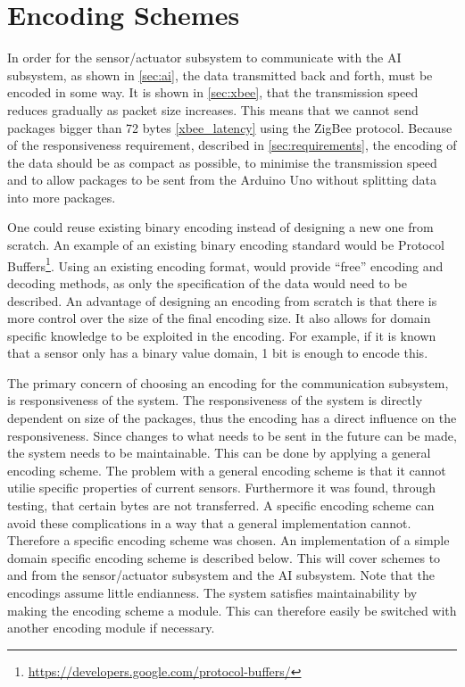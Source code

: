 \section{Encoding Schemes}
\label{sec:encoding}
In order for the sensor/actuator subsystem to communicate with the AI subsystem, as shown in \cref{sec:ai}, the data transmitted back and forth, must be encoded in some way. It is shown in \cref{sec:xbee}, that the transmission speed reduces gradually as packet size increases. This means that we cannot send packages bigger than 72 bytes \cref{xbee_latency} using the ZigBee protocol. Because of the responsiveness requirement, described in \cref{sec:requirements}, the encoding of the data should be as compact as possible, to minimise the transmission speed and to allow packages to be sent from the Arduino Uno without splitting data into more packages.

One could reuse existing binary encoding instead of designing a new one from scratch. An example of an existing binary encoding standard would be Protocol Buffers\footnote{\url{https://developers.google.com/protocol-buffers/}}. Using an existing encoding format, would provide \enquote{free} encoding and decoding methods, as only the specification of the data would need to be described. An advantage of designing an encoding from scratch is that there is more control over the size of the final encoding size. It also allows for domain specific knowledge to be exploited in the encoding. For example, if it is known that a sensor only has a binary value domain, 1 bit is enough to encode this.

The primary concern of choosing an encoding for the communication subsystem, is responsiveness of the system.
The responsiveness of the system is directly dependent on size of the packages, thus the encoding has a direct influence on the responsiveness. Since changes to what needs to be sent in the future can be made, the system needs to be maintainable. This can be done by applying a general encoding scheme. The problem with a general encoding scheme is that it cannot utilie specific properties of current sensors. Furthermore it was found, through testing, that certain bytes are not transferred. A specific encoding scheme can avoid these complications in a way that a general implementation cannot. Therefore a specific encoding scheme was chosen. An implementation of a simple domain specific encoding scheme is described below. This will cover schemes to and from the sensor/actuator subsystem and the AI subsystem. Note that the encodings assume little endianness. The system satisfies maintainability by making the encoding scheme a module. This can therefore easily be switched with another encoding module if necessary.


